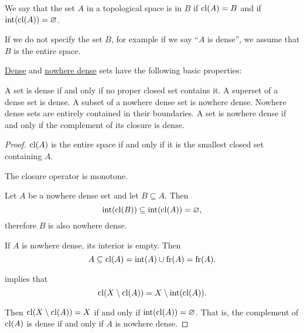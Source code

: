 \begin{definition}\label{def:topologically_dense_set}
  We say that the set \( A \) in a topological space is  in \( B \) if \( \operatorname{cl}(A) = B \) and  if \( \operatorname{int}(\operatorname{cl}(A)) = \varnothing \).

  If we do not specify the set \( B \), for example if we say \enquote{\( A \) is dense}, we assume that \( B \) is the entire space.
\end{definition}

\begin{proposition}\label{thm:def:topologically_dense_set}
  \hyperref[def:topologically_dense_set]{Dense} and \hyperref[def:topologically_dense_set]{nowhere dense} sets have the following basic properties:
  \begin{thmenum}
     A set is dense if and only if no proper closed set contains it.
     A superset of a dense set is dense.
     A subset of a nowhere dense set is nowhere dense.
     Nowhere dense sets are entirely contained in their boundaries.
     A set is nowhere dense if and only if the complement of its closure is dense.
  \end{thmenum}
\end{proposition}
\begin{proof}
   \( \operatorname{cl}(A) \) is the entire space if and only if it is the smallest closed set containing \( A \).

   The closure operator is monotone.

   Let \( A \) be a nowhere dense set and let \( B \subseteq A \). Then
  \begin{equation*}
    \operatorname{int}(\operatorname{cl}(B))
    \subseteq
    \operatorname{int}(\operatorname{cl}(A))
    =
    \varnothing,
  \end{equation*}
  therefore \( B \) is also nowhere dense.

   If \( A \) is nowhere dense, its interior is empty. Then
  \begin{equation*}
    A \subseteq \operatorname{cl}(A) = \operatorname{int}(A) \cup \operatorname{fr}(A) = \operatorname{fr}(A).
  \end{equation*}

    implies that
  \begin{equation*}
    \operatorname{cl}(X \setminus \operatorname{cl}(A)) = X \setminus \operatorname{int}(\operatorname{cl}(A)).
  \end{equation*}

  Then \( \operatorname{cl}(X \setminus \operatorname{cl}(A)) = X \) if and only if \( \operatorname{int}(\operatorname{cl}(A)) = \varnothing \). That is, the complement of \( \operatorname{cl}(A) \) is dense if and only if \( A \) is nowhere dense.
\end{proof}

